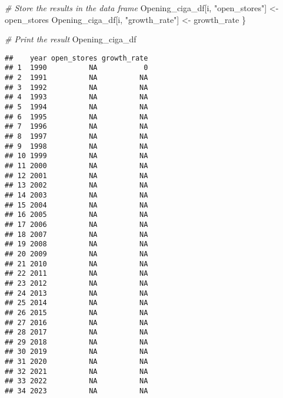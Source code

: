 \documentclass[
]{book}
\newenvironment{Shaded}{\begin{snugshade}}{\end{snugshade}}
\newcommand{\CommentTok}[1]{\textcolor[rgb]{0.56,0.35,0.01}{\textit{#1}}}
\newcommand{\NormalTok}[1]{#1}
\newcommand{\OtherTok}[1]{\textcolor[rgb]{0.56,0.35,0.01}{#1}}
\newcommand{\StringTok}[1]{\textcolor[rgb]{0.31,0.60,0.02}{#1}}
\begin{document}
\begin{Shaded}
\begin{Highlighting}[]
  \CommentTok{\# Store the results in the data frame}
\NormalTok{  Opening\_ciga\_df[i, }\StringTok{"open\_stores"}\NormalTok{] }\OtherTok{\textless{}{-}}\NormalTok{ open\_stores}
\NormalTok{  Opening\_ciga\_df[i, }\StringTok{"growth\_rate"}\NormalTok{] }\OtherTok{\textless{}{-}}\NormalTok{ growth\_rate}
\NormalTok{\}}

\CommentTok{\# Print the result}
\NormalTok{Opening\_ciga\_df}
\end{Highlighting}
\end{Shaded}

\begin{verbatim}
##    year open_stores growth_rate
## 1  1990          NA           0
## 2  1991          NA          NA
## 3  1992          NA          NA
## 4  1993          NA          NA
## 5  1994          NA          NA
## 6  1995          NA          NA
## 7  1996          NA          NA
## 8  1997          NA          NA
## 9  1998          NA          NA
## 10 1999          NA          NA
## 11 2000          NA          NA
## 12 2001          NA          NA
## 13 2002          NA          NA
## 14 2003          NA          NA
## 15 2004          NA          NA
## 16 2005          NA          NA
## 17 2006          NA          NA
## 18 2007          NA          NA
## 19 2008          NA          NA
## 20 2009          NA          NA
## 21 2010          NA          NA
## 22 2011          NA          NA
## 23 2012          NA          NA
## 24 2013          NA          NA
## 25 2014          NA          NA
## 26 2015          NA          NA
## 27 2016          NA          NA
## 28 2017          NA          NA
## 29 2018          NA          NA
## 30 2019          NA          NA
## 31 2020          NA          NA
## 32 2021          NA          NA
## 33 2022          NA          NA
## 34 2023          NA          NA
\end{verbatim}
\end{document}
